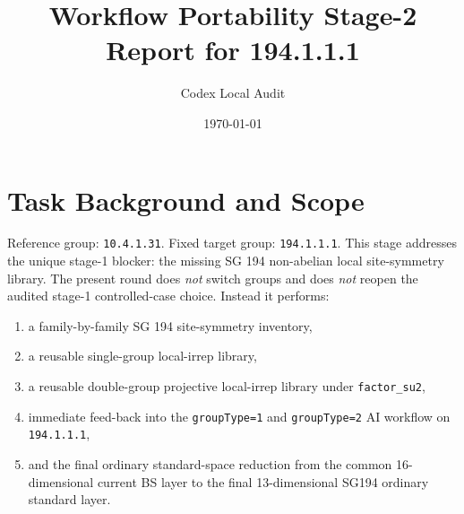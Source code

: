 \documentclass[11pt]{article}
\title{Workflow Portability Stage-2 Report for 194.1.1.1}
\author{Codex Local Audit}
\date{\today}
\begin{document}
\maketitle

\section{Task Background and Scope}
Reference group: \texttt{10.4.1.31}. Fixed target group: \texttt{194.1.1.1}. This stage addresses the unique stage-1 blocker: the missing SG 194 non-abelian local site-symmetry library. The present round does \emph{not} switch groups and does \emph{not} reopen the audited stage-1 controlled-case choice. Instead it performs:
\begin{enumerate}
\item a family-by-family SG 194 site-symmetry inventory,
\item a reusable single-group local-irrep library,
\item a reusable double-group projective local-irrep library under \texttt{factor\_su2},
\item immediate feed-back into the \texttt{groupType=1} and \texttt{groupType=2} AI workflow on \texttt{194.1.1.1},
\item and the final ordinary standard-space reduction from the common 16-dimensional current BS layer to the final 13-dimensional SG194 ordinary standard layer.
\end{enumerate}
\end{document}
